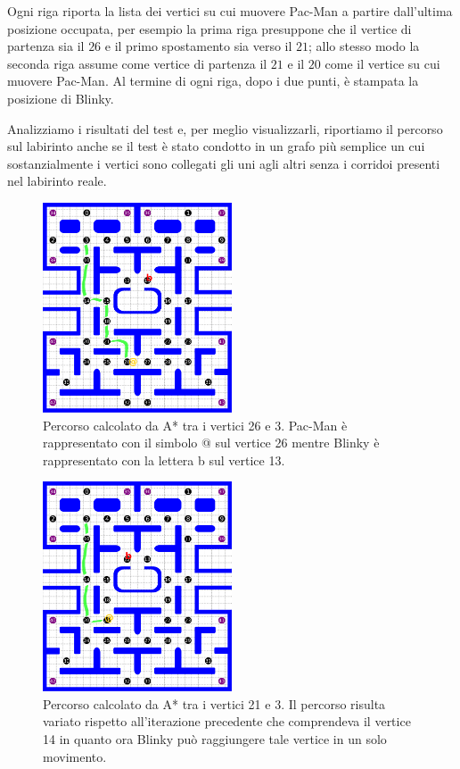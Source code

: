 \documentclass[8pt]{book}
\begin{document}
Ogni riga riporta la lista dei vertici su cui muovere Pac-Man a partire dall'ultima posizione occupata, per esempio la prima riga presuppone che il vertice di partenza sia il $26$ e il primo spostamento sia verso il $21$; allo stesso modo la seconda riga assume come vertice di partenza il $21$ e il $20$ come il vertice su cui muovere Pac-Man. Al termine di ogni riga, dopo i due punti, è stampata la posizione di Blinky.

Analizziamo i risultati del test e, per meglio visualizzarli, riportiamo il percorso sul labirinto anche se il test è stato condotto in un grafo più semplice un cui sostanzialmente i vertici sono collegati gli uni agli altri senza i corridoi presenti nel labirinto reale.

\begin{figure}
  \centering
  \includegraphics[width=0.5\textwidth]{img/Astar_3_1.png}
  \caption{Percorso calcolato da A* tra i vertici 26 e 3. Pac-Man è rappresentato con il simbolo @ sul vertice 26 mentre Blinky è rappresentato con la lettera b sul vertice 13.}
  \label{Astar_3_1}
\end{figure}


\begin{figure}
  \centering
  \includegraphics[width=0.5\textwidth]{img/Astar_4_1.png}
  \caption{Percorso calcolato da A* tra i vertici 21 e 3. Il percorso risulta variato rispetto all'iterazione precedente che comprendeva il vertice 14 in quanto ora Blinky può raggiungere tale vertice in un solo movimento.}
  \label{Astar_4_1}
\end{figure}
\end{document}
